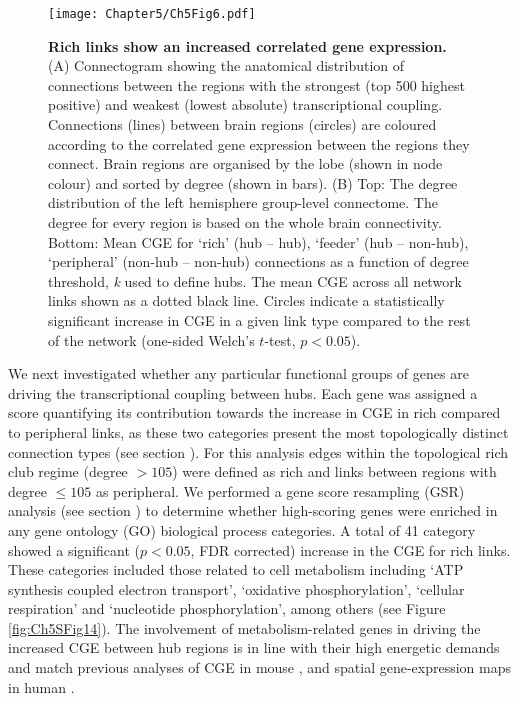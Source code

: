 \begin{figure}[h!]
\begin{center}
\texttt{[image: Chapter5/Ch5Fig6.pdf]}%
\end{center}
\caption{\textbf{Rich links show an increased correlated gene expression.}
(A) Connectogram showing the anatomical distribution of connections between the regions with the strongest (top 500 highest positive) and weakest (lowest absolute) transcriptional coupling. Connections (lines) between brain regions (circles) are coloured according to the correlated gene expression between the regions they connect. Brain regions are organised by the lobe (shown in node colour) and sorted by degree (shown in bars). 
(B) Top: The degree distribution of the left hemisphere group-level connectome. The degree for every region is based on the whole brain connectivity. Bottom: Mean CGE for `rich' (hub -- hub), `feeder' (hub -- non-hub), `peripheral' (non-hub -- non-hub) connections as a function of degree threshold, \textit{k} used to define hubs. The mean CGE across all network links shown as a dotted black line. Circles indicate a statistically significant increase in CGE in a given link type compared to the rest of the network (one-sided Welch's $t$-test, $p < 0.05$).}
\label{fig:Ch5Fig6}
\end{figure}

We next investigated whether any particular functional groups of genes are driving the transcriptional coupling between hubs. Each gene was assigned a score quantifying its contribution towards the increase in CGE in rich compared to peripheral links, as these two categories present the most topologically distinct connection types (see section ). For this analysis edges within the topological rich club regime (degree $> 105$) were defined as rich and links between regions with degree $\leq105$ as peripheral. We performed a gene score resampling (GSR) analysis (see section ) to determine whether high-scoring genes were enriched in any gene ontology (GO) biological process categories. A total of 41 category showed a significant ($p<0.05$, FDR corrected) increase in the CGE for rich links. These categories included those related to cell metabolism including `ATP synthesis coupled electron transport', `oxidative phosphorylation', `cellular respiration' and `nucleotide phosphorylation', among others (see Figure \ref{fig:Ch5SFig14}). The involvement of metabolism-related genes in driving the increased CGE between hub regions is in line with their high energetic demands \citep{Bullmore2012,Collin2014,Liang2013a,Tomasi2013} and match previous analyses of CGE in mouse \citep{Fulcher2016}, and spatial gene-expression maps in human \citep{Vertes2016b}.

